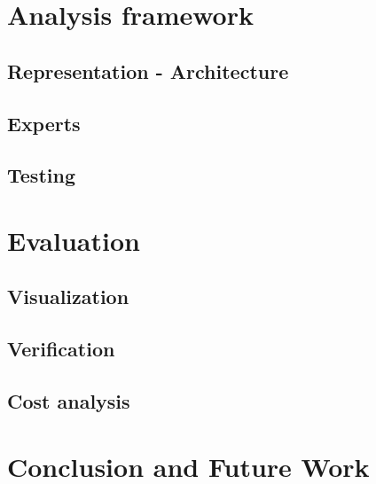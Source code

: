 \documentclass[sigconf]{acmart}
\begin{document}
	
	\section{Analysis framework}
	\subsection{Representation - Architecture} %
	
	\subsection{Experts} %
	\subsection{Testing} %
	
	\section{Evaluation}
	
	
	\subsection{Visualization} %
	\subsection{Verification} %
	\subsection{Cost analysis} %
	
	\section{Conclusion and Future Work} %
	
\end{document}
